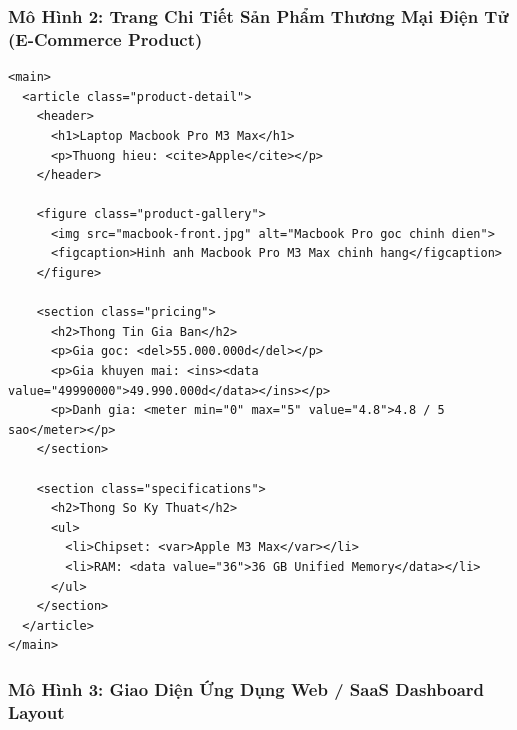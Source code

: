 \documentclass[11pt,oneside]{book}
\begin{document}
\clearpage
\subsubsection{Mô Hình 2: Trang Chi Tiết Sản Phẩm Thương Mại Điện Tử (E-Commerce Product)}

\begin{codeWindowBreakable}
\begin{lstlisting}[language=HTML5]
<main>
  <article class="product-detail">
    <header>
      <h1>Laptop Macbook Pro M3 Max</h1>
      <p>Thuong hieu: <cite>Apple</cite></p>
    </header>

    <figure class="product-gallery">
      <img src="macbook-front.jpg" alt="Macbook Pro goc chinh dien">
      <figcaption>Hinh anh Macbook Pro M3 Max chinh hang</figcaption>
    </figure>

    <section class="pricing">
      <h2>Thong Tin Gia Ban</h2>
      <p>Gia goc: <del>55.000.000d</del></p>
      <p>Gia khuyen mai: <ins><data value="49990000">49.990.000d</data></ins></p>
      <p>Danh gia: <meter min="0" max="5" value="4.8">4.8 / 5 sao</meter></p>
    </section>

    <section class="specifications">
      <h2>Thong So Ky Thuat</h2>
      <ul>
        <li>Chipset: <var>Apple M3 Max</var></li>
        <li>RAM: <data value="36">36 GB Unified Memory</data></li>
      </ul>
    </section>
  </article>
</main>
\end{lstlisting}
\end{codeWindowBreakable}

\clearpage
\subsubsection{Mô Hình 3: Giao Diện Ứng Dụng Web / SaaS Dashboard Layout}
\end{document}
